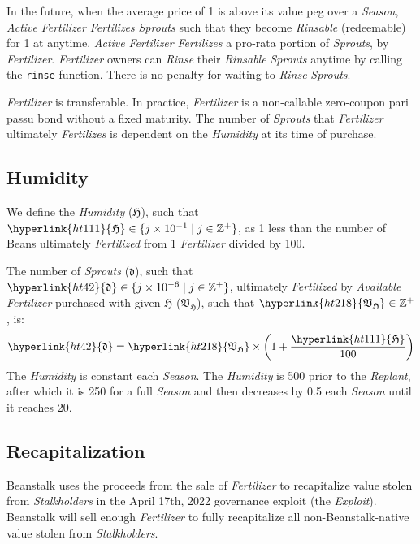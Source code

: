 \documentclass[tikz]{article}
\newcommand{\code}[1]{\texttt{#1}}
\newcommand{\term}[1]{\textsl{#1}}
\newcommand{\Bean}{} %
\begin{document}
In the future, when the average price of \Bean1 is above its value peg over a \term{Season}, \term{Active} \term{Fertilizer} \term{Fertilizes} \term{Sprouts} such that they become \term{Rinsable} (redeemable) for \Bean1 at anytime. \term{Active} \term{Fertilizer} \term{Fertilizes} a pro-rata portion of \term{Sprouts}, by \term{Fertilizer}. \term{Fertilizer} owners can \term{Rinse} their \term{Rinsable} \term{Sprouts} anytime by calling the \code{rinse} function. There is no penalty for waiting to \term{Rinse} \term{Sprouts}.

\term{Fertilizer} is transferable. In practice, \term{Fertilizer} is a non-callable zero-coupon pari passu bond without a fixed maturity. The number of \term{Sprouts} that \term{Fertilizer} ultimately \term{Fertilizes} is dependent on the \term{Humidity} at its time of purchase.

\subsection{Humidity}
We define the \term{Humidity} (\hyperlink{ht111}{$\mathfrak{H}$}), such that $\hyperlink{ht111}{\mathfrak{H}} \in \{j \times 10^{-1} \mid j \in \mathbb{Z}^{+} \}$, as 1 less than the number of Beans ultimately \term{Fertilized} from 1 \term{Fertilizer} divided by 100. 

The number of \term{Sprouts} (\hyperlink{ht42}{$\mathfrak{d}$}), such that $\hyperlink{ht42}{\mathfrak{d}} \in \{j \times 10^{-6} \mid j \in \mathbb{Z}^{+} \}$, ultimately \term{Fertilized} by \term{Available} \term{Fertilizer} purchased with given \hyperlink{ht111}{$\mathfrak{H}$} (\hyperlink{ht218}{$\mathfrak{V}_\mathfrak{H}$}), such that $\hyperlink{ht218}{\mathfrak{V}_\mathfrak{H}} \in \mathbb{Z}^{+}$, is:
$$\hyperlink{ht42}{\mathfrak{d}} = \hyperlink{ht218}{\mathfrak{V}_\mathfrak{H}} \times \left(1 + \frac{\hyperlink{ht111}{\mathfrak{H}}}{100}\right)$$
The \term{Humidity} is constant each \term{Season}. The \term{Humidity} is 500 prior to the \term{Replant}, after which it is 250 for a full \term{Season} and then decreases by 0.5 each \term{Season} until it reaches 20.

\subsection{Recapitalization}
Beanstalk uses the proceeds from the sale of \term{Fertilizer} to recapitalize value stolen from \term{Stalkholders} in the April 17th, 2022 governance exploit (the \term{Exploit}). Beanstalk will sell enough \term{Fertilizer} to fully recapitalize all non-Beanstalk-native value stolen from \term{Stalkholders}. 
\end{document}
